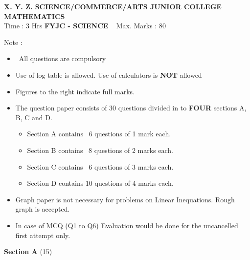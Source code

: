 \documentclass[12pt,a4paper]{article}
\begin{document}
\begin{center}
\textbf {X. Y. Z. SCIENCE/COMMERCE/ARTS JUNIOR COLLEGE } \\
\textbf{MATHEMATICS} \\

Time : 3 Hrs \hspace {3.6cm} \textbf {FYJC - SCIENCE}  \hspace{2.9cm} Max. Marks : 80

\end{center}

Note :

\begin {itemize}
\item  All questions are compulsory 

\item Use of log table is allowed. Use of calculators is \textbf{NOT} allowed

\item Figures to the right indicate full marks.

\item The question paper consists of 30 questions divided in to \textbf{FOUR} sections A, B, C and D. 

\begin {itemize}

\item Section A contains  6 questions of 1 mark each.

\item Section B contains  8 questions of 2 marks each.

\item Section C contains  6 questions of 3 marks each.

\item Section D contains 10 questions of 4 marks each.

\end{itemize}

\item Graph paper is not necessary for problems on Linear Inequations. Rough graph is accepted.

\item In case of MCQ (Q1 to Q6) Evaluation would be done for the uncancelled first attempt only. 

\end{itemize}



 \hfill \textbf{Section A} \tabto{17.9cm}(15)


\end{document}

